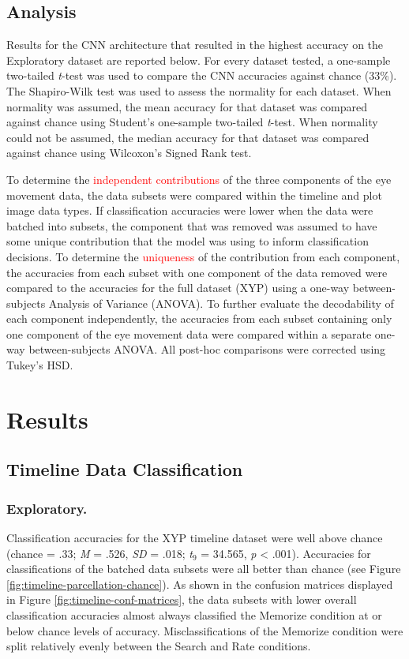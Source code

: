 \documentclass[
  english,
  man, donotrepeattitle,floatsintext]{apa6}
\begin{document}
\subsection{Analysis}

Results for the CNN architecture that resulted in the highest accuracy on the Exploratory dataset are reported below. For every dataset tested, a one-sample two-tailed \emph{t}-test was used to compare the CNN accuracies against chance (33\%). The Shapiro-Wilk test was used to assess the normality for each dataset. When normality was assumed, the mean accuracy for that dataset was compared against chance using Student's one-sample two-tailed \emph{t}-test. When normality could not be assumed, the median accuracy for that dataset was compared against chance using Wilcoxon's Signed Rank test.

To determine the \textcolor{red}{independent contributions} of the three components of the eye movement data, the data subsets were compared within the timeline and plot image data types. If classification accuracies were lower when the data were batched into subsets, the component that was removed was assumed to have some unique contribution that the model was using to inform classification decisions. To determine the \textcolor{red}{uniqueness} of the contribution from each component, the accuracies from each subset with one component of the data removed were compared to the accuracies for the full dataset (XYP) using a one-way between-subjects Analysis of Variance (ANOVA). To further evaluate the decodability of each component independently, the accuracies from each subset containing only one component of the eye movement data were compared within a separate one-way between-subjects ANOVA. All post-hoc comparisons were corrected using Tukey's HSD.

\section{Results}
\subsection{Timeline Data Classification}
\subsubsection{Exploratory.}

Classification accuracies for the XYP timeline dataset were well above chance (chance = .33; \emph{M} = .526, \emph{SD} = .018; \emph{t}\(_{9}\) = 34.565, \emph{p} \textless{} .001). Accuracies for classifications of the batched data subsets were all better than chance (see Figure \ref{fig:timeline-parcellation-chance}). As shown in the confusion matrices displayed in Figure \ref{fig:timeline-conf-matrices}, the data subsets with lower overall classification accuracies almost always classified the Memorize condition at or below chance levels of accuracy. Misclassifications of the Memorize condition were split relatively evenly between the Search and Rate conditions.
\end{document}
